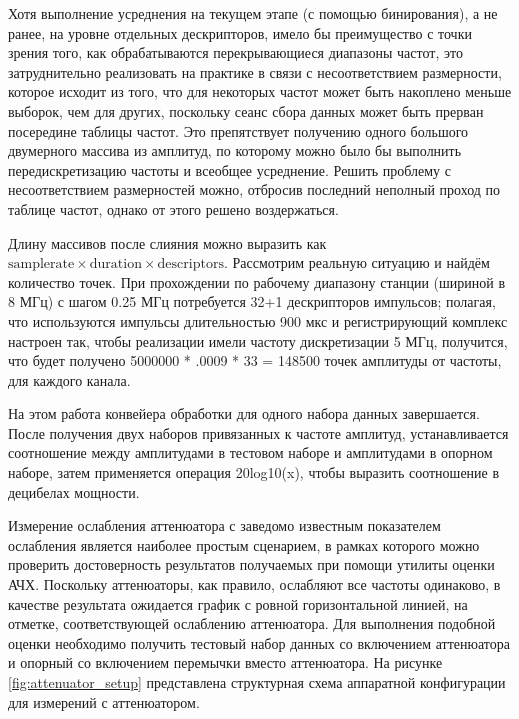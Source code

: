 \documentclass{report}
\begin{document}
Хотя выполнение усреднения на текущем этапе (с помощью бинирования), а не ранее, на уровне отдельных дескрипторов, имело бы преимущество с точки зрения того, как обрабатываются перекрывающиеся диапазоны частот, это затруднительно реализовать на практике в связи с несоответствием размерности, которое исходит из того, что для некоторых частот может быть накоплено меньше выборок, чем для других, поскольку сеанс сбора данных может быть прерван посередине таблицы частот. Это препятствует получению одного большого двумерного массива из амплитуд, по которому можно было бы выполнить передискретизацию частоты и всеобщее усреднение. Решить проблему с несоответствием размерностей можно, отбросив последний неполный проход по таблице частот, однако от этого решено воздержаться.

Длину массивов после слияния можно выразить как $\text{samplerate} \times \text{duration} \times \text{descriptors}$. Рассмотрим реальную ситуацию и найдём количество точек. При прохождении по рабочему диапазону станции (шириной в 8 МГц) с шагом 0.25 МГц потребуется 32+1 дескрипторов импульсов; полагая, что используются импульсы  длительностью 900 мкс и регистрирующий комплекс настроен так, чтобы реализации имели частоту дискретизации 5 МГц, получится, что будет получено 5000000 * .0009 * 33 = 148500 точек амплитуды от частоты, для каждого канала.

На этом работа конвейера обработки для одного набора данных завершается. После получения двух наборов привязанных к частоте амплитуд, устанавливается соотношение между амплитудами в тестовом наборе и амплитудами в опорном наборе, затем применяется операция 20log10(x), чтобы выразить соотношение в децибелах мощности.

Измерение ослабления аттенюатора с заведомо известным показателем ослабления является наиболее простым сценарием, в рамках которого можно проверить достоверность результатов получаемых при помощи утилиты оценки АЧХ. Поскольку аттенюаторы, как правило, ослабляют все частоты одинаково, в качестве результата ожидается график с ровной горизонтальной линией, на отметке, соответствующей ослаблению аттенюатора. Для выполнения подобной оценки необходимо получить тестовый набор данных со включением аттенюатора и опорный со включением перемычки вместо аттенюатора. На рисунке \ref{fig:attenuator_setup} представлена структурная схема аппаратной конфигурации для измерений с аттенюатором.

\end{document}
